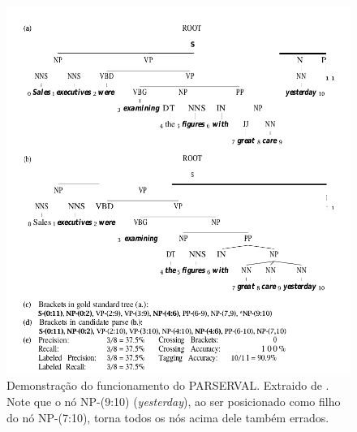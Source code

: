 \begin{figure}[!ht]
    \centering
    \includegraphics[width=\textwidth]{imagens/fig_demo_parseval.png}
    \caption[Demonstração do funcionamento do PARSERVAL]{Demonstração do funcionamento do PARSERVAL. Extraido de . Note que o nó NP-(9:10) (\textit{yesterday}), ao ser posicionado como filho do nó NP-(7:10), torna todos os nós acima dele também errados.}
    \label{fig:demo_parseval}
\end{figure}